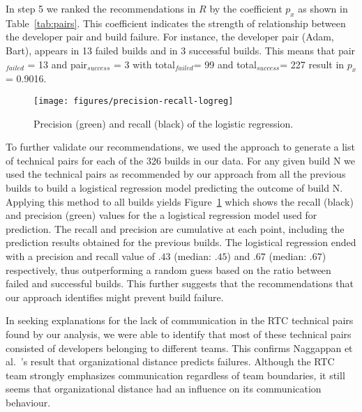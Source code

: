 
In step 5 we ranked the recommendations in $R$
by the coefficient $p_{x}$ as shown in Table~\ref{tab:pairs}. This coefficient indicates the strength of
relationship between the developer pair and build failure. For instance, the
developer pair (Adam, Bart), appears in 13 failed builds and in 3
successful builds. This means that pair$_{failed}$ = 13 and pair$_{success}$ = 3
with total$_{failed}$= 99 and total$_{success}$= 227 result in $p_x$= 0.9016.


\begin{figure}[t]
\vspace{-29pt}
\centering
\texttt{[image: figures/precision-recall-logreg]}
\vspace{-25pt}
\caption{Precision (green) and recall (black) of the logistic regression.}
\label{fig:prediction}
\vspace{-10pt}
\end{figure}

To further validate our recommendations, we used the approach to generate a list of technical pairs for each of the 326 builds in our data. For any given build N we used the technical pairs as recommended by our approach from all the previous builds to build a logistical regression model predicting the outcome of build N. 
Applying this method to all builds yields Figure~\ref{fig:prediction} which shows the recall (black) and precision (green) values for the a logistical regression model used for prediction.
The recall and precision are cumulative at each point, including the prediction results obtained for the previous builds.
The logistical regression ended with a precision and recall value of $.43$ (median: $.45$) and $.67$ (median: $.67$) respectively, thus outperforming a random guess based on the ratio between failed and successful builds.
This further suggests that the recommendations that our approach identifies might prevent build failure. 


In seeking explanations for the lack of communication in the RTC technical pairs found by our analysis, we were able to identify that most of these technical pairs consisted of developers belonging to
different teams. This confirms Naggappan et al.~\cite{nagappan:icse:2008}'s result that organizational distance predicts failures. Although the RTC team strongly emphasizes communication
regardless of team boundaries, it still seems that organizational distance had
an influence on its communication behaviour.



